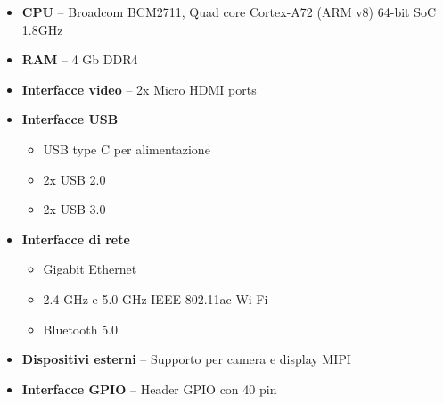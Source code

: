\documentclass[12pt]{report}
\begin{document}
\begin{itemize}
    \item \textbf{CPU} -- Broadcom BCM2711, Quad core Cortex-A72 (ARM v8) 64-bit SoC 1.8GHz
    \item \textbf{RAM} -- 4 Gb DDR4
    \item \textbf{Interfacce video} -- 2x Micro HDMI ports
    \item \textbf{Interfacce USB} \begin{itemize}
        \item USB type C per alimentazione
        \item  2x USB 2.0
        \item  2x USB 3.0
    \end{itemize}
    \item \textbf{Interfacce di rete}\begin{itemize}
        \item Gigabit Ethernet
        \item  2.4 GHz e 5.0 GHz IEEE 802.11ac Wi-Fi
        \item  Bluetooth 5.0
    \end{itemize}
    \item \textbf{Dispositivi esterni} -- Supporto per camera e display MIPI
    \item \textbf{Interfacce GPIO} -- Header GPIO con 40 pin
\end{itemize}
\vspace{0.5cm}
\end{document}
